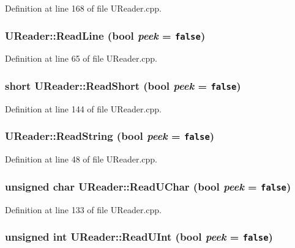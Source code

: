 Definition at line 168 of file UReader.cpp.\hypertarget{class_u_reader_7d6ca6cf5c7d647dc673737c30676525}{
\subsubsection[{ReadLine}]{ UReader::ReadLine (bool {\em peek} = {\tt false})}}
\label{class_u_reader_7d6ca6cf5c7d647dc673737c30676525}




Definition at line 65 of file UReader.cpp.\hypertarget{class_u_reader_4ddc2edc9b761259588297ef1618a68b}{
\subsubsection[{ReadShort}]{\setlength{\rightskip}{0pt plus 5cm}short UReader::ReadShort (bool {\em peek} = {\tt false})}}
\label{class_u_reader_4ddc2edc9b761259588297ef1618a68b}




Definition at line 144 of file UReader.cpp.\hypertarget{class_u_reader_2c8ded1a48118dd661e60ce19a6c926a}{
\subsubsection[{ReadString}]{ UReader::ReadString (bool {\em peek} = {\tt false})}}
\label{class_u_reader_2c8ded1a48118dd661e60ce19a6c926a}




Definition at line 48 of file UReader.cpp.\hypertarget{class_u_reader_030cf22cdee260c158a1446a44855c32}{
\subsubsection[{ReadUChar}]{\setlength{\rightskip}{0pt plus 5cm}unsigned char UReader::ReadUChar (bool {\em peek} = {\tt false})}}
\label{class_u_reader_030cf22cdee260c158a1446a44855c32}




Definition at line 133 of file UReader.cpp.\hypertarget{class_u_reader_14d2bfe8a38307b1ecb774b70c910c65}{
\subsubsection[{ReadUInt}]{\setlength{\rightskip}{0pt plus 5cm}unsigned int UReader::ReadUInt (bool {\em peek} = {\tt false})}}
\label{class_u_reader_14d2bfe8a38307b1ecb774b70c910c65}




